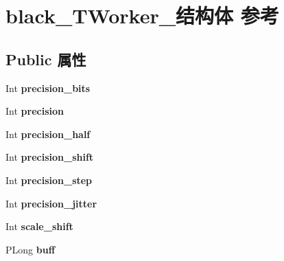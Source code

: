 \hypertarget{structblack___t_worker__}{}\section{black\+\_\+\+T\+Worker\+\_\+结构体 参考}
\label{structblack___t_worker__}
\subsection*{Public 属性}
\begin{DoxyCompactItemize}
\item 
\mbox{\label{structblack___t_worker___a107b2f825d657c132b073a3db7a78d31}} 
Int {\bfseries precision\+\_\+bits}
\item 
\mbox{\label{structblack___t_worker___a3ff084dc7318c617a0dfc3eb84cdf2a8}} 
Int {\bfseries precision}
\item 
\mbox{\label{structblack___t_worker___af9803d7235c791c7da80bf8a52cfcc4e}} 
Int {\bfseries precision\+\_\+half}
\item 
\mbox{\label{structblack___t_worker___af1469894851017f2ee98024cd2c532a4}} 
Int {\bfseries precision\+\_\+shift}
\item 
\mbox{\label{structblack___t_worker___ab94a80c4ccbe225761301b68b35dceaf}} 
Int {\bfseries precision\+\_\+step}
\item 
\mbox{\label{structblack___t_worker___a6e9e353bf856971c1df9c2ae8fb0e74b}} 
Int {\bfseries precision\+\_\+jitter}
\item 
\mbox{\label{structblack___t_worker___a02c8558b46acbb13229d0dc4a5cc6111}} 
Int {\bfseries scale\+\_\+shift}
\item 
\mbox{\label{structblack___t_worker___ab1369079407528eddbb0a835d34c8e8a}} 
P\+Long {\bfseries buff}
\item 
\mbox{\label{structblack___t_worker___ae85371224bd8ec68e3efb685fbf5bb1e}} 

\end{DoxyCompactItemize}
